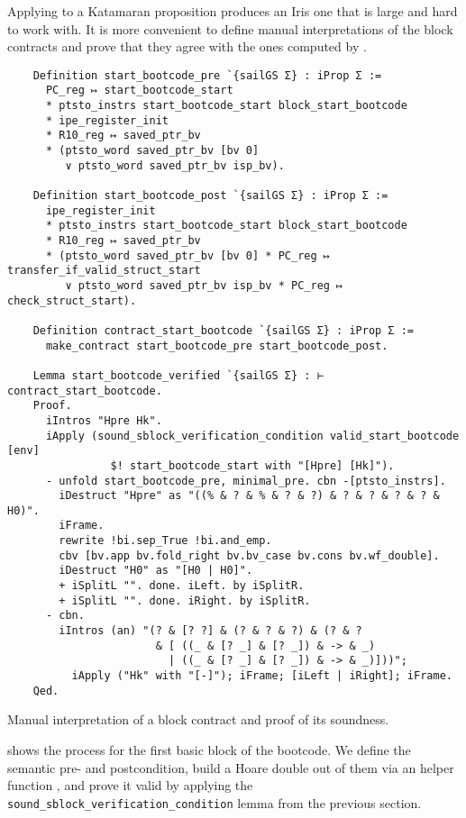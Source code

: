 Applying  to a Katamaran proposition produces an Iris one that is large and hard to work with. It is more convenient to define manual interpretations of the block contracts and prove that they agree with the ones computed by .

\begin{listing}
  \begin{verbatim}
    Definition start_bootcode_pre `{sailGS Σ} : iProp Σ :=
      PC_reg ↦ start_bootcode_start
      * ptsto_instrs start_bootcode_start block_start_bootcode
      * ipe_register_init
      * R10_reg ↦ saved_ptr_bv
      * (ptsto_word saved_ptr_bv [bv 0]
         ∨ ptsto_word saved_ptr_bv isp_bv).

    Definition start_bootcode_post `{sailGS Σ} : iProp Σ :=
      ipe_register_init
      * ptsto_instrs start_bootcode_start block_start_bootcode
      * R10_reg ↦ saved_ptr_bv
      * (ptsto_word saved_ptr_bv [bv 0] * PC_reg ↦ transfer_if_valid_struct_start
         ∨ ptsto_word saved_ptr_bv isp_bv * PC_reg ↦ check_struct_start).

    Definition contract_start_bootcode `{sailGS Σ} : iProp Σ :=
      make_contract start_bootcode_pre start_bootcode_post.

    Lemma start_bootcode_verified `{sailGS Σ} : ⊢ contract_start_bootcode.
    Proof.
      iIntros "Hpre Hk".
      iApply (sound_sblock_verification_condition valid_start_bootcode [env]
                $! start_bootcode_start with "[Hpre] [Hk]").
      - unfold start_bootcode_pre, minimal_pre. cbn -[ptsto_instrs].
        iDestruct "Hpre" as "((% & ? & % & ? & ?) & ? & ? & ? & ? & H0)".
        iFrame.
        rewrite !bi.sep_True !bi.and_emp.
        cbv [bv.app bv.fold_right bv.bv_case bv.cons bv.wf_double].
        iDestruct "H0" as "[H0 | H0]".
        + iSplitL "". done. iLeft. by iSplitR.
        + iSplitL "". done. iRight. by iSplitR.
      - cbn.
        iIntros (an) "(? & [? ?] & (? & ? & ?) & (? & ?
                       & [ ((_ & [? _] & [? _]) & -> & _)
                         | ((_ & [? _] & [? _]) & -> & _)]))";
          iApply ("Hk" with "[-]"); iFrame; [iLeft | iRight]; iFrame.
    Qed.
  \end{verbatim}
  \caption{Manual interpretation of a block contract and proof of its soundness.}
  \label{lst:start_bootcode_verified}
\end{listing}

 shows the process for the first basic block of the bootcode. We define the semantic pre- and postcondition, build a Hoare double out of them via an helper function , and prove it valid by applying the \texttt{sound\_sblock\_ver\-i\-fi\-ca\-tion\_con\-di\-tion} lemma from the previous section.

